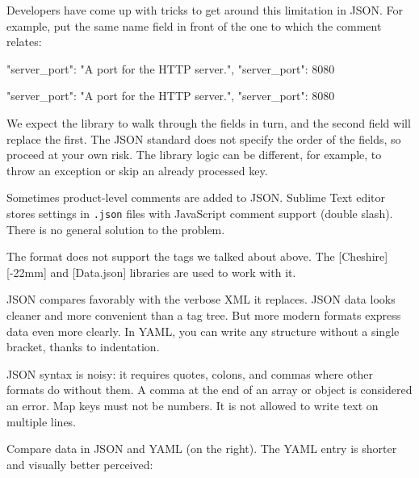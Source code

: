 Developers have come up with tricks to get around this limitation in JSON.  For example, put the same name field in front of the one to which the comment relates:

\ifx\DEVICETYPE\MOBILE

\begin{english}
  \begin{json}
{
    "server_port":
    "A port for the HTTP server.",
    "server_port": 8080
}
  \end{json}
\end{english}

\else

\begin{english}
  \begin{json}
{
    "server_port": "A port for the HTTP server.",
    "server_port": 8080
}
  \end{json}
\end{english}

\fi

We expect the library to walk through the fields in turn, and the second field will replace the first. The JSON standard does not specify the order of the fields, so proceed at your own risk. The library logic can be different, for example, to throw an exception or skip an already processed key.

Sometimes product-level comments are added to JSON. Sublime Text editor stores settings in \verb|.json| files with JavaScript comment support (double slash). There is no general solution to the problem.


The format does not support the tags we talked about above. The [Cheshire][-22mm] and [Data.json] libraries are used to work with it.

JSON compares favorably with the verbose XML it replaces. JSON data looks cleaner and more convenient than a tag tree.  But more modern formats express data even more clearly. In YAML, you can write any structure without a single bracket, thanks to indentation.

JSON syntax is noisy: it requires quotes, colons, and commas where other formats do without them. A comma at the end of an array or object is considered an error. Map keys must not be numbers. It is not allowed to write text on multiple lines.

Compare data in JSON and YAML (on the right). The YAML entry is shorter and visually better perceived:

